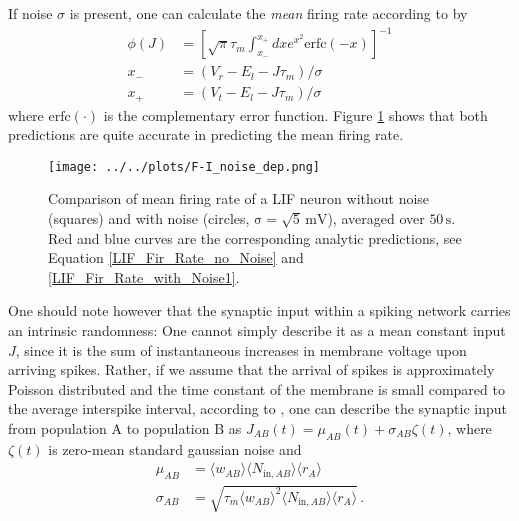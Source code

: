 \documentclass[10pt,a4paper]{article}
\begin{document}
If noise $\sigma$ is present, one can calculate the \emph{mean} firing rate according to \cite{Roxin_Firing_Rate_Distribution} by
\begin{align}
\phi(J) &= \left[ \sqrt{\pi}\tau_m \int_{x_-}^{x_+} dx e^{x^2} \mathrm{erfc}(-x) \right]^{-1} \label{LIF_Fir_Rate_with_Noise1}\\
x_- &= \left( V_r-E_l-J\tau_m \right)/\sigma \label{LIF_Fir_Rate_with_Noise2}\\
x_+ &= \left( V_t-E_l-J\tau_m \right)/\sigma \label{LIF_Fir_Rate_with_Noise3}
\end{align}
where $\mathrm{erfc(\cdot)}$ is the complementary error function. Figure \ref{F-I_noise_dep} shows that both predictions are quite accurate in predicting the mean firing rate. 
\begin{figure}
\begin{center}
\texttt{[image: ../../plots/F-I\_noise\_dep.png]}
\end{center}
\caption[Comparison of mean firing rate of a LIF neuron without noise and with noise]{Comparison of mean firing rate of a LIF neuron without noise (squares) and with noise (circles, $\mathrm{\sigma = \sqrt{5}\, mV}$), averaged over $\mathrm{50\, s}$. Red and blue curves are the corresponding analytic predictions, see Equation \eqref{LIF_Fir_Rate_no_Noise} and \eqref{LIF_Fir_Rate_with_Noise1}.}
\label{F-I_noise_dep}
\end{figure}
One should note however that the synaptic input within a spiking network carries an intrinsic randomness: One cannot simply describe it as a mean constant input $J$, since it is the sum of instantaneous increases in membrane voltage upon arriving spikes. Rather, if we assume that the arrival of spikes is approximately Poisson distributed and the time constant of the membrane is small compared to the average interspike interval, according to \cite{Roxin_Firing_Rate_Distribution}, one can describe the synaptic input from population $\mathrm{A}$ to population $\mathrm{B}$ as $J_{AB}(t) = \mu_{AB} (t) + \sigma_{AB} \zeta(t)$, where $\zeta(t)$ is zero-mean standard gaussian noise and
\begin{align}
\mu_{AB} &= \langle w_{AB} \rangle  \langle N_{\mathrm{in},AB} \rangle \langle r_A \rangle \label{Noise_Approx_1}\\
\sigma_{AB} &= \sqrt{\tau_m  \langle w_{AB} \rangle ^2  \langle N_{\mathrm{in},AB} \rangle  \langle r_A \rangle} \label{Noise_Approx_2} \, .
\end{align}
\end{document}
